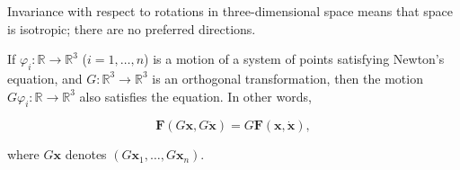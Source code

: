 Invariance with respect to rotations in three-dimensional space means that space is isotropic; there are no preferred directions.

If $\varphi_i: \mathbb{R} \rightarrow \mathbb{R}^3$ ($i = 1, \ldots, n$) is a motion of a system of points satisfying Newton's equation, and $G: \mathbb{R}^3 \rightarrow \mathbb{R}^3$ is an orthogonal transformation, then the motion $G\varphi_i: \mathbb{R} \rightarrow \mathbb{R}^3$ also satisfies the equation. In other words,

$$\mathbf{F}(G\mathbf{x}, G\dot{\mathbf{x}}) = G\mathbf{F}(\mathbf{x}, \dot{\mathbf{x}}),$$

where $G\mathbf{x}$ denotes $(G\mathbf{x}_1, \ldots, G\mathbf{x}_n)$.
